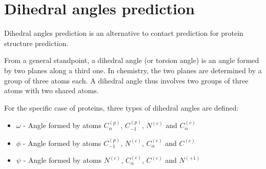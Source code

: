 \section{Dihedral angles prediction}

Dihedral angles prediction is an alternative to contact prediction
for protein structure prediction.

From a general standpoint, a dihedral angle (or torsion angle)
is an angle formed by two planes
along a third one. In chemistry,
the two planes are determined by a group of three atoms each.
A dihedral angle thus involves two groups of three atoms with two shared atoms.

For the specific case of proteins, three types of dihedral angles are defined:
\begin{itemize}
    \item $\omega$ - Angle formed by atoms $C_{\alpha}^{(p)}$, $C_{-1}^{(p)}$, $N^{(c)}$ and $C_{\alpha}^{(c)}$
    \item $\phi$ - Angle formed by atoms $C_{-1}^{(p)}$, $N^{(c)}$, $C_{\alpha}^{(c)}$ and $C^{(c)}$
    \item $\psi$ - Angle formed by atoms $N^{(c)}$, $C_{\alpha}^{(c)}$, $C^{(c)}$ and $N^{(+1)}$
\end{itemize}
